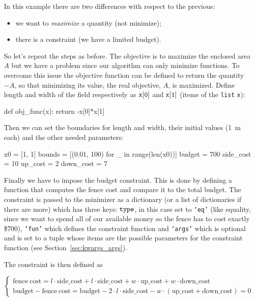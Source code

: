 In this example there are two differences with respect to the previous:

\begin{itemize}
\tightlist
\item
  we want to \emph{maximize} a quantity (not minimize);
\item
  there is a constraint (we have a limited budget).
\end{itemize}

So let's repeat the steps as before. The objective is to maximize the enclosed area \(A\) but we have a problem since our algorithm can only minimize functions. To overcome this issue the objective function can be defined to return the quantity \(-A\), so that minimizing its value, the real objective, $A$, is maximized. 
Define length and width of the field respectively as \(\tt{x[0]}\) and \(\tt{x[1]}\) (items of the \texttt{list} \texttt{x}):

\begin{ipython}
def obj_func(x):
    return -x[0]*x[1]
\end{ipython}
Then we can set the boundaries for length and width, their initial values (1~m each) and the other needed parameters:

\begin{ipython}
x0 = [1, 1]
bounds = [(0.01, 100) for _ in range(len(x0))]
budget = 700
side_cost = 10
up_cost = 2
down_cost = 7
\end{ipython}

Finally we have to impose the budget constraint. This is done by defining a function that computes the fence cost and compare it to the total budget. 
The constraint is passed to the minimizer as a dictionary (or a list  of dictionaries if there are more) which has three keys: \(\tt{type}\), in this case set to \texttt{'eq'} (like equality, since we want to spend all of our available money so the fence has to cost exactly \$700), \texttt{'fun'} which defines the constraint function and \texttt{'args'} which is optional and is set to a tuple whose items are the possible parameters for the constraint function (see Section~\ref{sec:kwargs_args}).

The constraint is then defined as

\begin{equation*}
\begin{cases}
\mathrm{fence~cost} = l\cdot\mathrm{side\_cost} + l\cdot\mathrm{side\_cost} + w\cdot\mathrm{up\_cost} + w\cdot\mathrm{down\_cost}\\
\mathrm{budget} - \mathrm{fence~cost} = \mathrm{budget} - 2\cdot l\cdot\mathrm{side\_cost} - w\cdot(\mathrm{up\_cost} + \mathrm{down\_cost}) = 0
\end{cases}
\end{equation*}

